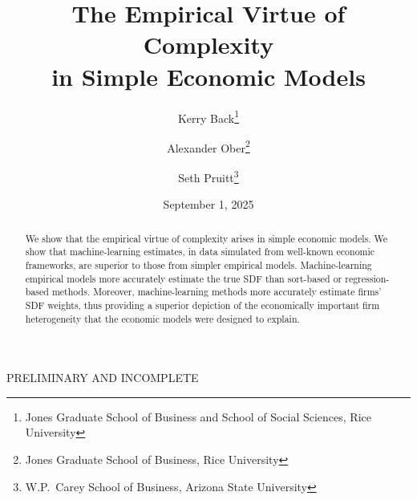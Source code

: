 \documentclass[12pt]{scrarticle}
\begin{document}
\doublespacing
\date{September 1, 2025}

\title{The Empirical Virtue of Complexity\\ in Simple Economic Models}

\author{Kerry Back\thanks{Jones Graduate School of Business and School of Social Sciences, Rice University} 
\and Alexander Ober\thanks{Jones Graduate School of Business, Rice University} 
\and Seth Pruitt\thanks{W.P.\ Carey School of Business, Arizona State University} }

\maketitle
\thispagestyle{empty}

\begin{abstract}
We show that the empirical virtue of complexity arises in simple economic models. We show that machine-learning estimates, in data simulated from well-known economic frameworks, are superior to those from simpler empirical models. Machine-learning empirical models more accurately estimate the true SDF than sort-based or regression-based methods. Moreover, machine-learning methods more accurately estimate firms' SDF weights, thus providing a superior depiction of the economically important firm heterogeneity that the economic models were designed to explain.
\end{abstract}

\vspace*{2\baselineskip}
\centerline{PRELIMINARY AND INCOMPLETE}

\clearpage\setcounter{page}{1}
\end{document}

